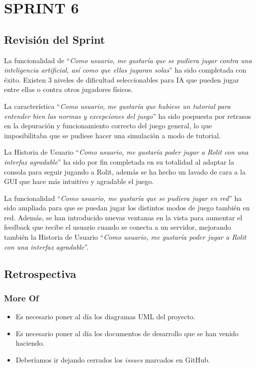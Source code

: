 \documentclass[../../FINAL/Scrum/SCRUM.tex]{subfiles}
\begin{document}
\section{SPRINT 6}
\subsection{Revisión del Sprint}
La funcionalidad de ``\textit{Como usuario, me gustaría que se pudiera jugar contra una inteligencia artificial, así como que ellas jugaran solas}'' ha sido completada con éxito. Existen 3 niveles de dificultad seleccionables para IA que pueden jugar entre ellas o contra otros jugadores físicos.

La característica ``\textit{Como usuario, me gustaría que hubiese un tutorial para entender bien las normas y excepciones del juego}'' ha sido pospuesta por retrasos en la depuración y funcionamiento correcto del juego general, lo que imposibilitaba que se pudiese hacer una simulación a modo de tutorial.

La Historia de Usuario ``\textit{Como usuario, me gustaría poder jugar a Rolit con una interfaz agradable}'' ha sido por fin completada en su totalidad al adaptar la consola para seguir jugando a Rolit, además se ha hecho un lavado de cara a la GUI que hace más intuitivo y agradable el juego.

La funcionalidad ``\textit{Como usuario, me gustaría que se pudiera jugar en red}'' ha sido ampliada para que se puedan jugar los distintos modos de juego también en red. Además, se han introducido nuevas ventanas en la vista para aumentar el feedback que recibe el usuario cuando se conecta a un servidor, mejorando también la Historia de Usuario ``\textit{Como usuario, me gustaría poder jugar a Rolit con una interfaz agradable}''.

\subsection{Retrospectiva}
\subsubsection*{More Of}
\begin{itemize}
\item Es necesario poner al día los diagramas UML del proyecto.
\item Es necesario poner al día los documentos de desarrollo que se han venido haciendo.
\item Deberíamos ir dejando cerrados los \textit{issues} marcados en GitHub.
\end{itemize}
\end{document}
